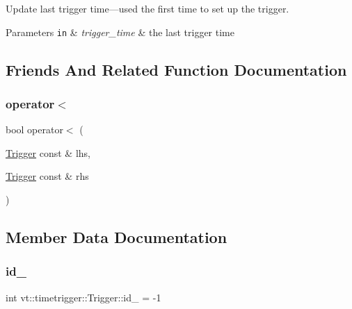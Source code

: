 Update last trigger time---used the first time to set up the trigger. 


\begin{DoxyParams}[1]{Parameters}
\mbox{\tt in}  & {\em trigger\+\_\+time} & the last trigger time \\
\hline
\end{DoxyParams}


\subsection{Friends And Related Function Documentation}
\mbox{\label{structvt_1_1timetrigger_1_1_trigger_a9e42ae58737ff5be162e315dd41b1ee2}} 
\subsubsection{\texorpdfstring{operator$<$}{operator<}}
{\footnotesize\ttfamily bool operator$<$ (\begin{DoxyParamCaption}\item[{\hyperlink{structvt_1_1timetrigger_1_1_trigger}{Trigger} const \&}]{lhs,  }\item[{\hyperlink{structvt_1_1timetrigger_1_1_trigger}{Trigger} const \&}]{rhs }\end{DoxyParamCaption})\hspace{0.3cm}{\ttfamily [friend]}}



\subsection{Member Data Documentation}
\mbox{\label{structvt_1_1timetrigger_1_1_trigger_a1a640c2311fa49ed0a7b79480dda4439}} 
\subsubsection{\texorpdfstring{id\+\_\+}{id\_}}
{\footnotesize\ttfamily int vt\+::timetrigger\+::\+Trigger\+::id\+\_\+ = -\/1\hspace{0.3cm}{\ttfamily [private]}}

